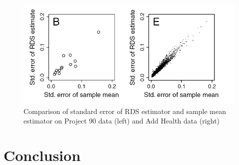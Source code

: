 \documentclass[12pt]{report}
\begin{document}
\begin{figure}[h]
    \centering
    \includegraphics[height=200px]{rdsVSmean}
    \caption{ Comparison of standard error of RDS estimator and sample mean estimator on Project 90 data (left) and Add Health data (right)  \cite{goel2010assessing}}
\end{figure}

\chapter{Conclusion}




\end{document}

